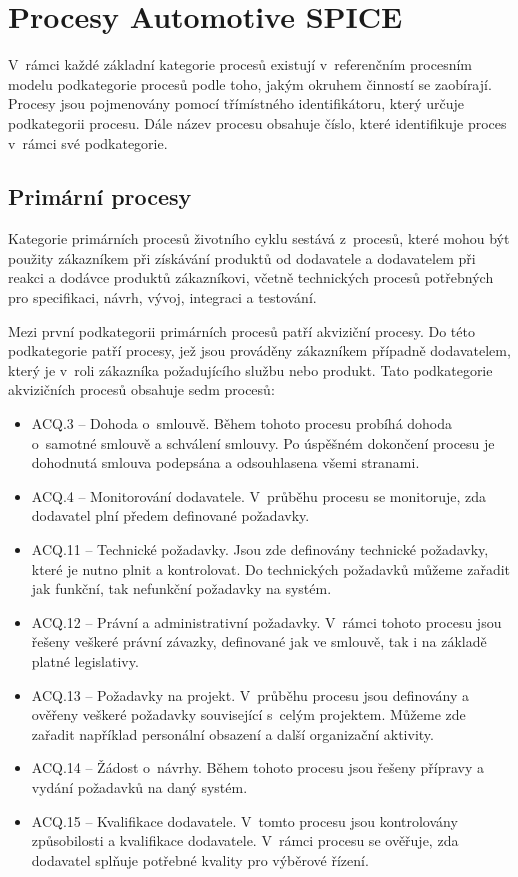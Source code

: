 \documentclass[czech,master]{diploma}
\begin{document}

\section{Procesy Automotive SPICE}
\label{sec:aspice_processes}
V~rámci každé základní kategorie procesů existují v~referenčním procesním modelu podkategorie procesů podle toho, jakým okruhem činností se zaobírají. Procesy jsou pojmenovány pomocí třímístného identifikátoru, který určuje podkategorii procesu. Dále název procesu obsahuje číslo, které identifikuje proces v~rámci své podkategorie.

\subsection{Primární procesy}
Kategorie primárních procesů životního cyklu sestává z~procesů, které mohou být použity zákazníkem při získávání produktů od dodavatele a dodavatelem při reakci a dodávce produktů zákazníkovi, včetně technických procesů potřebných pro specifikaci, návrh, vývoj, integraci a testování.

Mezi první podkategorii primárních procesů patří akviziční procesy. Do této podkategorie patří procesy, jež jsou prováděny zákazníkem případně dodavatelem, který je v~roli zákazníka požadujícího službu nebo produkt. Tato podkategorie akvizičních procesů obsahuje sedm procesů:

\begin{itemize}
\item ACQ.3 -- Dohoda o~smlouvě. Během tohoto procesu probíhá dohoda o~samotné smlouvě a schválení smlouvy. Po úspěšném dokončení procesu je dohodnutá smlouva podepsána a odsouhlasena všemi stranami.
\item ACQ.4 -- Monitorování dodavatele. V~průběhu procesu se monitoruje, zda dodavatel plní předem definované požadavky.
\item ACQ.11 -- Technické požadavky. Jsou zde definovány technické požadavky, které je nutno plnit a kontrolovat. Do technických požadavků můžeme zařadit jak funkční, tak nefunkční požadavky na systém.
\item ACQ.12 -- Právní a administrativní požadavky. V~rámci tohoto procesu jsou řešeny veškeré právní závazky, definované jak ve smlouvě, tak i  na základě platné legislativy.
\item ACQ.13 -- Požadavky na projekt. V~průběhu procesu jsou definovány a ověřeny veškeré požadavky související s~celým projektem. Můžeme zde zařadit například personální obsazení a další organizační aktivity.
\item ACQ.14 -- Žádost o~návrhy.  Během tohoto procesu jsou řešeny přípravy a vydání požadavků na daný systém.
\item ACQ.15 -- Kvalifikace dodavatele. V~tomto procesu jsou kontrolovány způsobilosti a kvalifikace dodavatele. V~rámci procesu se ověřuje, zda dodavatel splňuje potřebné kvality pro výběrové řízení.
\end{itemize}
\end{document}
